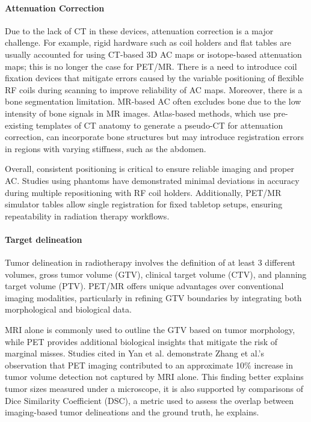 \begin{multicols}{2}
\paragraph{Attenuation Correction}
Due to the lack of CT in these devices, attenuation correction is a major challenge. For example, rigid hardware such as coil holders and flat tables are usually accounted for using CT-based 3D AC maps or isotope-based attenuation maps; this is no longer the case for PET/MR. There is a need to introduce coil fixation devices that mitigate errors caused by the variable positioning of flexible RF coils during scanning to improve reliability of AC maps. Moreover, there is a bone segmentation limitation. MR-based AC often excludes bone due to the low intensity of bone signals in MR images. Atlas-based methods, which use pre-existing templates of CT anatomy to generate a pseudo-CT for attenuation correction, can incorporate bone structures but may introduce registration errors in regions with varying stiffness, such as the abdomen.

Overall, consistent positioning is critical to ensure reliable imaging and proper AC. Studies using phantoms have demonstrated minimal deviations in accuracy during multiple repositioning with RF coil holders. Additionally, PET/MR simulator tables allow single registration for fixed tabletop setups, ensuring repeatability in radiation therapy workflows.

\paragraph{Target delineation}
Tumor delineation in radiotherapy involves the definition of at least 3 different volumes, gross tumor volume (GTV), clinical target volume (CTV), and planning target volume (PTV). PET/MR offers unique advantages over conventional imaging modalities, particularly in refining GTV boundaries by integrating both morphological and biological data.


MRI alone is commonly used to outline the GTV based on tumor morphology, while PET provides additional biological insights that mitigate the risk of marginal misses. Studies cited in Yan et al. demonstrate Zhang et al.’s \cite{Zhang2014} observation that PET imaging contributed to an approximate 10\% increase in tumor volume detection not captured by MRI alone.\cite{yan2024} This finding better explains tumor sizes measured under a microscope, it is also supported by comparisons of Dice Similarity Coefficient (DSC), a metric used to assess the overlap between imaging-based tumor delineations and the ground truth, he explains.%


\end{multicols}
